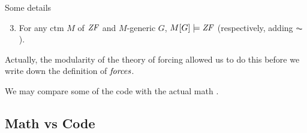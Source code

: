 \documentclass[english]{beamer}
\begin{document}
\begin{frame}{Some details}
  \begin{alertblock}{}
    \begin{enumerate}\setcounter{enumi}{2}
    \item For any ctm $M$ of $\mathit{ZF}$ and $M$-generic $G$, $M[G] \models
      \mathit{ZF}$ (respectively, adding $\AC$).
    \end{enumerate}
  \end{alertblock}
  \pause
  Actually, the modularity of the theory of forcing allowed us to do
  this \alert{before} we write down the definition of $\mathit{forces}$.
  \pause
  
  We may compare some of the code with the actual
  math \citep{kunen2011set}.
\end{frame}

\subsection{Math vs Code}
\end{document}
